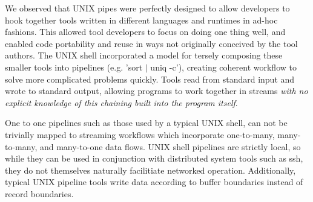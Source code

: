 We observed that UNIX pipes were perfectly designed to allow 
developers to hook together tools written
in different languages and runtimes in ad-hoc fashions.  
This allowed
tool developers to focus on doing one thing well, and enabled code
portability and reuse in ways not originally conceived by the tool
authors.  The UNIX shell incorporated a model for tersely composing
these smaller tools into pipelines (e.g. 'sort $|$ uniq -c'), 
creating
coherent workflow to solve more complicated problems quickly.  Tools
read from standard input and wrote to standard output, allowing
programs to work together in streams \emph{with no explicit knowledge
of this chaining built into the program itself}.

One to one pipelines such as those used by a typical UNIX shell,
can not be trivially mapped to streaming workflows which incorporate
one-to-many, many-to-many, and many-to-one data flows.  
UNIX shell pipelines are strictly local, so while they can be used in
conjunction with distributed system tools such as ssh, they do not 
themselves naturally facilitiate networked operation.
Additionally,
typical UNIX pipeline tools write data according to buffer boundaries
instead of record boundaries.  

